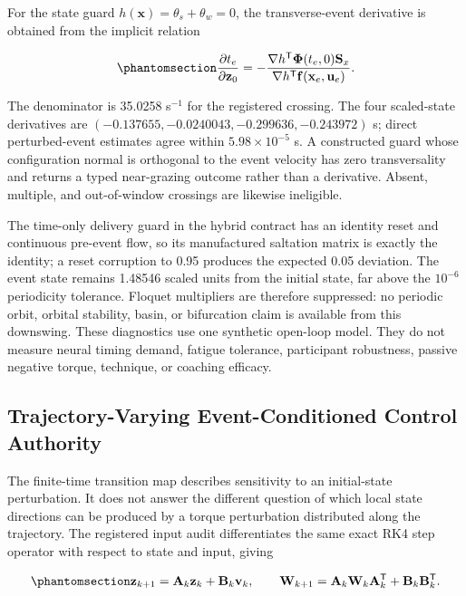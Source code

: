 \documentclass[
  letterpaper,
]{report}
\begin{document}
For the state guard \(h(\mathbf x)=\theta_s+\theta_w=0\), the
transverse-event derivative is obtained from the implicit relation

\begin{equation}\phantomsection\label{eq-ladder-event-sensitivity}{
\frac{\partial t_e}{\partial \mathbf z_0}
=-\frac{\nabla h^\mathsf T\boldsymbol\Phi(t_e,0)\mathbf S_x}
{\nabla h^\mathsf T\mathbf f(\mathbf x_e,\mathbf u_e)}.
}\end{equation}

The denominator is 35.0258 s\(^{-1}\) for the registered crossing. The
four scaled-state derivatives are
\((-0.137655,-0.0240043,-0.299636,-0.243972)\) s; direct perturbed-event
estimates agree within \(5.98\times10^{-5}\) s. A constructed guard
whose configuration normal is orthogonal to the event velocity has zero
transversality and returns a typed near-grazing outcome rather than a
derivative. Absent, multiple, and out-of-window crossings are likewise
ineligible.

The time-only delivery guard in the hybrid contract has an identity
reset and continuous pre-event flow, so its manufactured saltation
matrix is exactly the identity; a reset corruption to 0.95 produces the
expected 0.05 deviation. The event state remains 1.48546 scaled units
from the initial state, far above the \(10^{-6}\) periodicity tolerance.
Floquet multipliers are therefore suppressed: no periodic orbit, orbital
stability, basin, or bifurcation claim is available from this downswing.
These diagnostics use one synthetic open-loop model. They do not measure
neural timing demand, fatigue tolerance, participant robustness, passive
negative torque, technique, or coaching efficacy.

\subsection{Trajectory-Varying Event-Conditioned Control
Authority}\label{sec-ladder-trajectory-control-authority}

The finite-time transition map describes sensitivity to an initial-state
perturbation. It does not answer the different question of which local
state directions can be produced by a torque perturbation distributed
along the trajectory. The registered input audit differentiates the same
exact RK4 step operator with respect to state and input, giving

\begin{equation}\phantomsection\label{eq-ladder-trajectory-gramian}{
\mathbf z_{k+1}=\mathbf A_k\mathbf z_k+\mathbf B_k\mathbf v_k,
\qquad
\mathbf W_{k+1}=\mathbf A_k\mathbf W_k\mathbf A_k^\mathsf T
+\mathbf B_k\mathbf B_k^\mathsf T.
}\end{equation}
\end{document}
